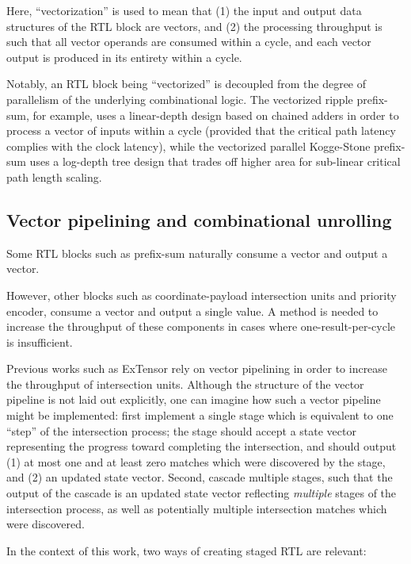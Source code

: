 Here, ``vectorization'' is used to mean that (1) the input and output data structures of the RTL block are vectors, and (2) the processing throughput is such that all vector operands are consumed within a cycle, and each vector output is produced in its entirety within a cycle.

Notably, an RTL block being ``vectorized'' is decoupled from the degree of parallelism of the underlying combinational logic. The vectorized ripple prefix-sum, for example, uses a linear-depth design based on chained adders in order to process a vector of inputs within a cycle (provided that the critical path latency complies with the clock latency), while the vectorized parallel Kogge-Stone\cite{koggestone} prefix-sum uses a log-depth tree design that trades off higher area for sub-linear critical path length scaling.

\subsection{Vector pipelining and combinational unrolling}

Some RTL blocks such as prefix-sum naturally consume a vector and output a vector.

However, other blocks such as coordinate-payload intersection units and priority encoder, consume a vector and output a single value. A method is needed to increase the throughput of these components in cases where one-result-per-cycle is insufficient.

Previous works such as ExTensor\cite{extensor} rely on vector pipelining in order to increase the throughput of intersection units. Although the structure of the vector pipeline is not laid out explicitly, one can imagine how such a vector pipeline might be implemented: first implement a single stage which is equivalent to one ``step'' of the intersection process; the stage should accept a state vector representing the progress toward completing the intersection, and should output (1) at most one and at least zero matches which were discovered by the stage, and (2) an updated state vector. Second, cascade multiple stages, such that the output of the cascade is an updated state vector reflecting \textit{multiple} stages of the intersection process, as well as potentially multiple intersection matches which were discovered.

In the context of this work, two ways of creating staged RTL are relevant:

